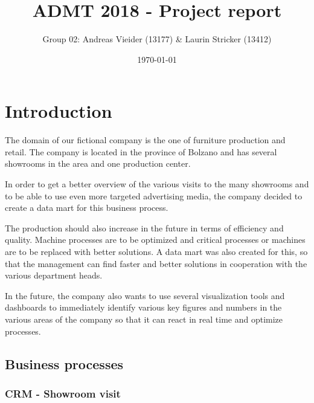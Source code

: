\documentclass[letterpaper,12pt]{article}
\begin{document}
\title{ADMT 2018 - Project report}
\author{Group 02: Andreas Vieider (13177) \& Laurin Stricker (13412)}
\date{\today}

\renewcommand\maketitlehooka{\null\mbox{}\vfill}
\renewcommand\maketitlehookd{\vfill\null}

\clearpage
\maketitle
\thispagestyle{empty}

\newpage

\tableofcontents
\listoffigures
\listoftables
\cleardoublepage



\section{Introduction}

The domain of our fictional company is the one of furniture production and retail. The company is located in the province of Bolzano and has several showrooms in the area and one production center.

In order to get a better overview of the various visits to the many showrooms and to be able to use even more targeted advertising media, the company decided to create a data mart for this business process.

The production should also increase in the future in terms of efficiency and quality. Machine processes are to be optimized and critical processes or machines are to be replaced with better solutions. A data mart was also created for this, so that the management can find faster and better solutions in cooperation with the various department heads.

In the future, the company also wants to use several visualization tools and dashboards to immediately identify various key figures and numbers in the various areas of the company so that it can react in real time and optimize processes.

\subsection{Business processes}

\subsubsection{CRM - Showroom visit}
\end{document}
